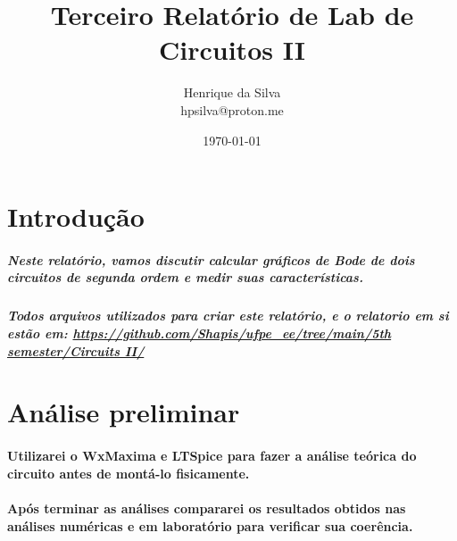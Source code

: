 \documentclass[12pt,twoside, a4paper, twocolumn]{article}
\title{Terceiro Relatório de Lab de Circuitos II}
\author{Henrique da Silva \\ hpsilva@proton.me}
\date{\today}
\begin{document}
\maketitle
{}
\newpage
\tableofcontents
\newpage


\section{Introdução}




\subparagraph*{Neste relatório, vamos discutir calcular gráficos de Bode de dois circuitos de segunda ordem e medir suas características.}




\subparagraph*{Todos arquivos utilizados para criar este relatório, e o relatorio em si estão em:  \url{https://github.com/Shapis/ufpe_ee/tree/main/5th semester/Circuits II/}}
















\section{Análise preliminar}




\paragraph*{Utilizarei o WxMaxima e LTSpice para fazer a análise teórica do circuito antes de montá-lo fisicamente.}




\paragraph*{Após terminar as análises compararei os resultados obtidos nas análises numéricas e em laboratório para verificar sua coerência.}
\end{document}
